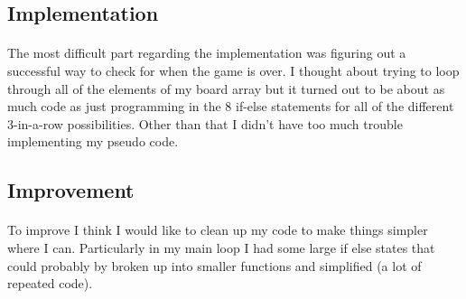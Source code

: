 \documentclass[a4paper, 11pt]{article}
\begin{document}
\subsection*{Implementation} 
	\paragraph{}
	The most difficult part regarding the implementation was figuring out a successful way to check for when the game is over. I thought about trying to loop through all of the elements of my board array but it turned out to be about as much code as just programming in the 8 if-else statements for all of the different 3-in-a-row possibilities. Other than that I didn't have too much trouble implementing my pseudo code. 
\subsection*{Improvement} 
	\paragraph{} 
	To improve I think I would like to clean up my code to make things simpler where I can. Particularly in my main loop I had some large if else states that could probably by broken up into smaller functions and simplified (a lot of repeated code). 
	

		
\end{document}
